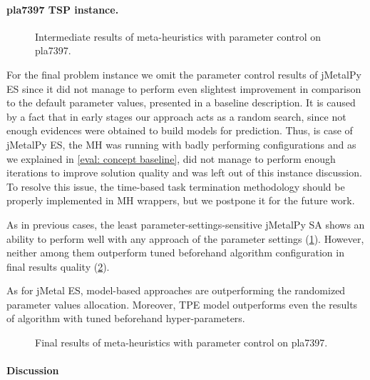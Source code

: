 \newpage
\paragraph{pla7397 TSP instance.}
\begin{figure}[t]
	\centering
	
	\caption{Intermediate results of meta-heuristics with parameter control on pla7397.}
	\label{eval:pict:pc:pla7397 intermediate}
\end{figure}

For the final problem instance we omit the parameter control results of jMetalPy ES since it did not manage to perform even slightest improvement in comparison to the default parameter values, presented in a baseline description. It is caused by a fact that in early stages our approach acts as a random search, since not enough evidences were obtained to build models for prediction. Thus, is case of jMetalPy ES, the MH was running with badly performing configurations and as we explained in \cref{eval: concept baseline}, did not manage to perform enough iterations to improve solution quality and was left out of this instance discussion. To resolve this issue, the time-based task termination methodology should be properly implemented in MH wrappers, but we postpone it for the future work.

As in previous cases, the least parameter-settings-sensitive jMetalPy SA shows an ability to perform well with any approach of the parameter settings (\cref{eval:pict:pc:pla7397 intermediate}). However, neither among them outperform tuned beforehand algorithm configuration in final results quality (\cref{eval:pict:pc:pla7397 final}).

As for jMetal ES, model-based approaches are outperforming the randomized parameter values allocation. Moreover, TPE model outperforms even the results of algorithm with tuned beforehand hyper-parameters.

\begin{figure}[b]
	\centering
	
	\caption{Final results of meta-heuristics with parameter control on pla7397.}
	\label{eval:pict:pc:pla7397 final}
\end{figure}

\paragraph{Discussion} 



